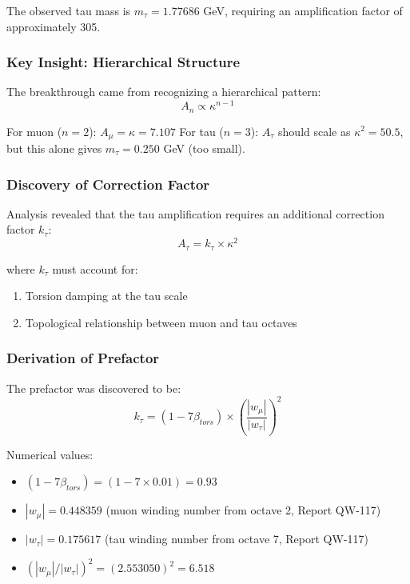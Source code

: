 \documentclass[11pt, a4paper]{article}
\begin{document}
The observed tau mass is $m_\tau = 1.77686$ GeV, requiring an amplification factor of approximately 305.

\subsubsection{Key Insight: Hierarchical Structure}

The breakthrough came from recognizing a hierarchical pattern:
\begin{equation}
A_n \propto \kappa^{n-1}
\end{equation}

For muon ($n=2$): $A_\mu = \kappa = 7.107$
For tau ($n=3$): $A_\tau$ should scale as $\kappa^2 = 50.5$, but this alone gives $m_\tau = 0.250$ GeV (too small).

\subsubsection{Discovery of Correction Factor}

Analysis revealed that the tau amplification requires an additional correction factor $k_\tau$:
\begin{equation}
A_\tau = k_\tau \times \kappa^2
\end{equation}

where $k_\tau$ must account for:
\begin{enumerate}
    \item Torsion damping at the tau scale
    \item Topological relationship between muon and tau octaves
\end{enumerate}

\subsubsection{Derivation of Prefactor}

The prefactor was discovered to be:
\begin{equation}
k_\tau = (1 - 7\beta_{tors}) \times \left(\frac{|w_\mu|}{|w_\tau|}\right)^2
\end{equation}

Numerical values:
\begin{itemize}
    \item $(1 - 7\beta_{tors}) = (1 - 7 \times 0.01) = 0.93$
    \item $|w_\mu| = 0.448359$ (muon winding number from octave 2, Report QW-117)
    \item $|w_\tau| = 0.175617$ (tau winding number from octave 7, Report QW-117)
    \item $(|w_\mu|/|w_\tau|)^2 = (2.553050)^2 = 6.518$
\end{itemize}
\end{document}
